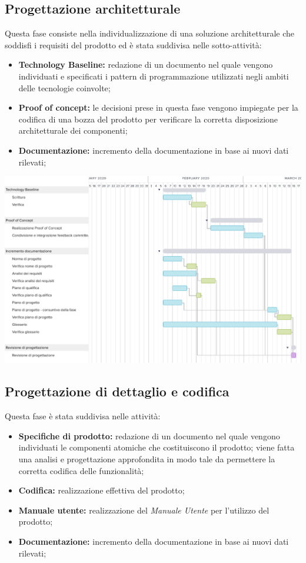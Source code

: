 \subsection{Progettazione architetturale}
Questa fase consiste nella individualizzazione di una soluzione architetturale che soddisfi i requisiti del prodotto ed è stata suddivisa nelle sotto-attività:
\begin{itemize}
	\item \textbf{Technology Baseline:} redazione di un documento nel quale vengono individuati e specificati i pattern di programmazione utilizzati negli ambiti delle tecnologie coinvolte;
	\item  \textbf{Proof of concept:} le decisioni prese in questa fase vengono impiegate per la codifica di una bozza del prodotto per verificare la corretta disposizione architetturale dei componenti;
	\item \textbf{Documentazione:} incremento della documentazione in base ai nuovi dati rilevati;
\end{itemize}
\includegraphics[width=\textwidth]{res/img/g3}

\subsection{Progettazione di dettaglio e codifica}
Questa fase è stata suddivisa nelle attività:
\begin{itemize}
	\item \textbf{Specifiche di prodotto:} redazione di un documento nel quale vengono individuati le componenti atomiche che costituiscono il prodotto; viene fatta una analisi e progettazione approfondita in modo tale da permettere la corretta codifica delle funzionalità;
	\item  \textbf{Codifica:} realizzazione effettiva del prodotto;
	\item \textbf{Manuale utente:} realizzazione del \textit{Manuale Utente} per l'utilizzo del prodotto;
	\item \textbf{Documentazione:} incremento della documentazione in base ai nuovi dati rilevati;
\end{itemize}

